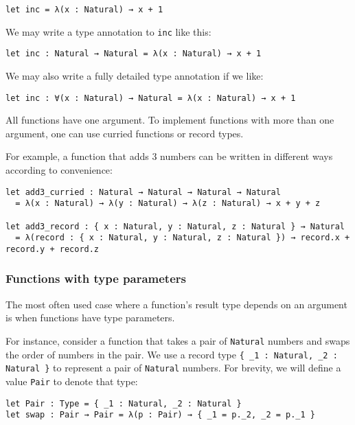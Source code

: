 \begin{lstlisting}[language=Dhall]
let inc = λ(x : Natural) → x + 1
\end{lstlisting}


We may write a type annotation to \lstinline!inc! like this:


\begin{lstlisting}[language=Dhall]
let inc : Natural → Natural = λ(x : Natural) → x + 1
\end{lstlisting}


We may also write a fully detailed type annotation if we like:


\begin{lstlisting}[language=Dhall]
let inc : ∀(x : Natural) → Natural = λ(x : Natural) → x + 1
\end{lstlisting}


All functions have one argument.
To implement functions with more than one argument, one can use curried functions or record types.


For example, a function that adds 3 numbers can be written in different ways according to convenience:


\begin{lstlisting}[language=Dhall]
let add3_curried : Natural → Natural → Natural → Natural
  = λ(x : Natural) → λ(y : Natural) → λ(z : Natural) → x + y + z

let add3_record : { x : Natural, y : Natural, z : Natural } → Natural
  = λ(record : { x : Natural, y : Natural, z : Natural }) → record.x + record.y + record.z
\end{lstlisting}


\subsubsection{Functions with type parameters}


The most often used case where a function's result type depends on an argument is when functions have type parameters.


For instance, consider a function that takes a pair of \lstinline!Natural! numbers and swaps the order of numbers in the pair.
We use a record type \lstinline!{ _1 : Natural, _2 : Natural }! to represent a pair of \lstinline!Natural! numbers.
For brevity, we will define a value \lstinline!Pair! to denote that type:


\begin{lstlisting}[language=Dhall]
let Pair : Type = { _1 : Natural, _2 : Natural }
let swap : Pair → Pair = λ(p : Pair) → { _1 = p._2, _2 = p._1 }
\end{lstlisting}


